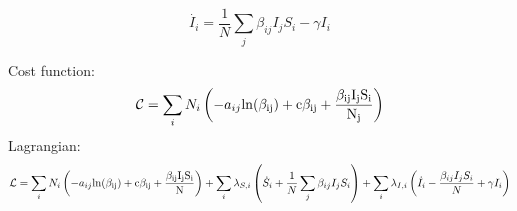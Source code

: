 \documentclass[11pt]{article} %
\begin{document}
\begin{equation}
\dot{I_i} = \frac{1}{N}\sum_j{\beta_{ij}I_jS_i}-\gamma I_i
\end{equation}

Cost function:
\begin{equation}
\mathcal{C} =\sum_i N_i\left( -a_{ij}\rm{ln}({\beta_{ij}})+c\beta_{ij}+\frac{\beta_{ij}{I_jS_i}}{N_j}\right)
\end{equation}
Lagrangian:
\begin{equation}
\mathcal{L} = \sum_i N_i\left( -a_{ij}\rm{ln}({\beta_{ij}})+c\beta_{ij}+\frac{\beta_{ij}{I_jS_i}}{N}\right)+
\sum_i \lambda_{S,i}\left( \dot{S}_i+\frac{1}{N}\sum_j{\beta_{ij}I_jS_i}\right)+\sum_i \lambda_{I,i}\left(\dot{I}_i -\frac{\beta_{ij}I_jS_i}{N}+\gamma I_i  \right)
\end{equation}
\end{document}
